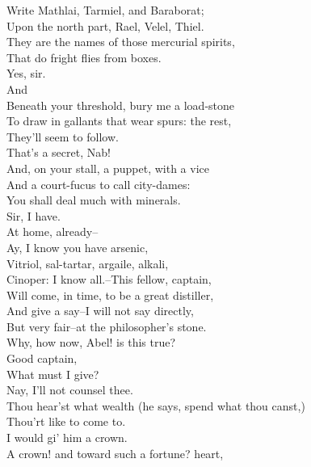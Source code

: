 \documentclass{memoir}
\begin{document}
\begin{drama*}
 Write Mathlai, Tarmiel, and Baraborat;\\
 Upon the north part, Rael, Velel, Thiel.\\
 They are the names of those mercurial spirits,\\
 That do fright flies from boxes.\\
\druggerspeaks {} Yes, sir.\\
\subtlespeaks {} And\\
 Beneath your threshold, bury me a load-stone\\
 To draw in gallants that wear spurs: the rest,\\
 They'll seem to follow.\\
\facespeaks {} That's a secret, Nab!\\
\subtlespeaks  And, on your stall, a puppet, with a vice\\
 And a court-fucus to call city-dames:\\
 You shall deal much with minerals.\\
\druggerspeaks {} Sir, I have.\\
 At home, already--\\
\subtlespeaks {} Ay, I know you have arsenic,\\
 Vitriol, sal-tartar, argaile, alkali,\\
 Cinoper: I know all.--This fellow, captain,\\
 Will come, in time, to be a great distiller,\\
 And give a say--I will not say directly,\\
 But very fair--at the philosopher's stone.\\
\facespeaks  Why, how now, Abel! is this true?\\
\druggerspeaks {} Good captain,\\
 What must I give?\\
\facespeaks {} Nay, I'll not counsel thee.\\
 Thou hear'st what wealth (he says, spend what thou canst,)\\
 Thou'rt like to come to.\\
\druggerspeaks {} I would gi' him a crown.\\
\facespeaks  A crown! and toward such a fortune? heart,\\

\end{drama*}
\end{document}
